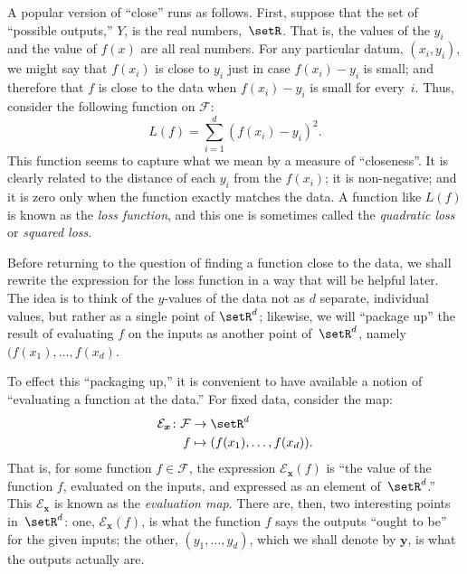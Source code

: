 \documentclass[10pt, a4paper]{article}
\begin{document}
A popular version of “close” runs as follows. First, suppose that the
set of “possible outputs,” $Y$, is the real numbers,~$\setR$. That is,
the values of the $y_i$ and the value of $f(x)$ are all real
numbers. For any particular datum, $(x_i, y_i)$, we might say that
$f(x_i)$ is close to $y_i$ just in case $ f(x_i)-y_i $ is small; and
therefore that $f$ is close to the data when $f(x_i)-y_i$ is small for
every~$i$. Thus, consider the following function on $\mathcal{F}$:
\[
L(f) = \sum_{i=1}^d{(f(x_i) - y_i)}^2.
\]
This function seems to capture what we mean by a measure of
“closeness”. It is clearly related to the distance of each $y_i$ from
the $f(x_i)$; it is non-negative; and it is zero only when the
function exactly matches the data. A function like $L(f)$ is known as
the \emph{loss function}, and this one is sometimes called the
\emph{quadratic loss} or \emph{squared loss}.

Before returning to the question of finding a function close to the
data, we shall rewrite the expression for the loss function in a way
that will be helpful later. The idea is to think of the $y$-values of
the data not as $d$ separate, individual values, but rather as a
single point of $\setR^d$; likewise, we will “package up” the result
of evaluating $f$ on the inputs as another point of~$\setR^d$, namely
$(f(x_1),\dotsc, f(x_d)$. 

To effect this “packaging up,” it is convenient to have available a
notion of “evaluating a function at the data.” For fixed data,
consider the map:
\[
  \begin{aligned}
    \mathcal{E}_{\bm{x}} \colon \mathcal{F} &\to \setR^d \\
    f &\mapsto (f(x_1), \dotsc, f(x_d)).
  \end{aligned}
\]
That is, for some function $f\in\mathcal{F}$, the expression
$\mathcal{E}_{\bm{x}}(f)$ is “the value of the function $f$, evaluated on the
inputs, and expressed as an element of~$\setR^d$.” This
$\mathcal{E}_{\bm{x}}$ is known as the \emph{evaluation map}. There are, then, two interesting points in~$\setR^d$: one,
$\mathcal{E}_{\bm{x}}(f)$, is what the function $f$ says the outputs “ought to
be” for the given inputs; the other, $(y_1, \dotsc, y_d)$, which we
shall denote by $\bm{y}$, is what the outputs actually are.
\end{document}
